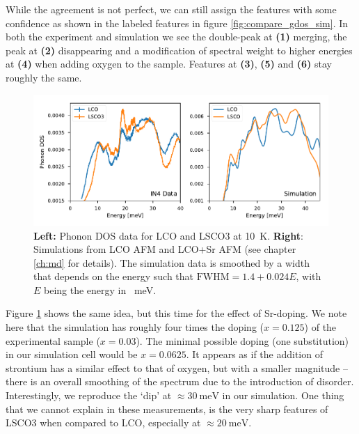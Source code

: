 While the agreement is not perfect, we can still assign the features with some confidence as shown in the labeled features in figure \ref{fig:compare_gdos_sim}. In both the experiment and simulation we see the double-peak at \textbf{(1)} merging, the peak at \textbf{(2)} disappearing and a modification of spectral weight to higher energies at \textbf{(4)} when adding oxygen to the sample. Features at \textbf{(3)}, \textbf{(5)} and \textbf{(6)} stay roughly the same.

\begin{figure}
    \centering
    \includegraphics[width=\textwidth]{fig/gdos/lco_lsco_sim_compare.pdf}
    \caption{\textbf{Left:} Phonon DOS data for LCO and LSCO3 at \SI{10}{\kelvin}. \textbf{Right}: Simulations from LCO AFM and LCO+Sr AFM (see chapter \ref{ch:md} for details). The simulation data is smoothed by a width that depends on the energy such that $\text{FWHM} = 1.4 + 0.024E$, with $E$ being the energy in \SI{}{\milli\eV}.}
    \label{fig:compare_lco_lsco_sim}
\end{figure}

Figure \ref{fig:compare_lco_lsco_sim} shows the same idea, but this time for the effect of Sr-doping. We note here that the simulation has roughly four times the doping ($x=0.125$) of the experimental sample ($x=0.03$). The minimal possible doping (one substitution) in our simulation cell would be $x=0.0625$. It appears as if the addition of strontium has a similar effect to that of oxygen, but with a smaller magnitude -- there is an overall smoothing of the spectrum due to the introduction of disorder. Interestingly, we reproduce the `dip' at $\approx \SI{30}{\milli\eV}$ in our simulation. One thing that we cannot explain in these measurements, is the very sharp features of LSCO3 when compared to LCO, especially at $\approx \SI{20}{\milli\eV}$. 

